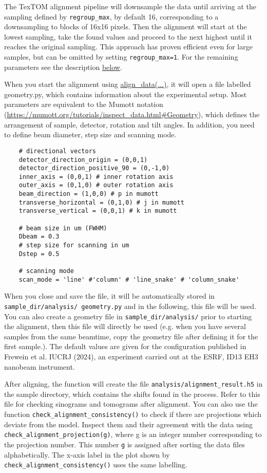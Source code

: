 The TexTOM alignment pipeline will downsample the data until arriving at the 
sampling defined by \texttt{regroup\_max}, by default 16, corresponding to a downsampling to blocks of 16x16 pixels.
Then the alignment will start at the lowest sampling, take the found values and proceed to the next highest until it reaches the
original sampling. This approach has proven efficient even for large samples, but can be omitted by setting \texttt{regroup\_max=1}.
For the remaining parameters see the description \hyperref[fun:aligndata]{below}.

When you start the alignment using \hyperref[fun:aligndata]{align\_data(...)}, it will open a file labelled geometry.py, which contains information about the
experimental setup. Most parameters are equivalent to the Mumott notation (\url{https://mumott.org/tutorials/inspect_data.html#Geometry}),
which defines the arrangement of sample, detector, rotation and tilt angles.
In addition, you need to define beam diameter, step size and scanning mode.

\begin{verbatim}
    # directional vectors
    detector_direction_origin = (0,0,1)
    detector_direction_positive_90 = (0,-1,0)
    inner_axis = (0,0,1) # inner rotation axis
    outer_axis = (0,1,0) # outer rotation axis
    beam_direction = (1,0,0) # p in mumott
    transverse_horizontal = (0,1,0) # j in mumott
    transverse_vertical = (0,0,1) # k in mumott
    
    # beam size in um (FWHM)
    Dbeam = 0.3 
    # step size for scanning in um
    Dstep = 0.5
    
    # scanning mode
    scan_mode = 'line' #'column' # 'line_snake' # 'column_snake'    
\end{verbatim}

When you close and save the file, it will be automatically stored in \texttt{sample\_dir/analysis/ geometry.py} and in the following,
this file will be used. You can also create a geometry file in \texttt{sample\_dir/analysis/} prior to starting the alignment,
then this file will directly be used (e.g. when you have several samples from the same beamtime, copy the geometry file after
defining it for the first sample.). The default values are given for the configuration published in Frewein et al. IUCRJ (2024), an experiment
carried out at the ESRF, ID13 EH3 nanobeam instrument.

After aligning, the function will create the file \texttt{analysis/alignment\_result.h5} in the sample directory, which contains the shifts found
in the process. Refer to this file for checking sinograms and tomograms after alignment.
You can also use the function \texttt{check\_alignment\_consistency()} to check if there are projections which deviate from the
model. Inspect them and their agreement with the data using \texttt{check\_alignment\_projection(g)}, where g is an integer number
corresponding to the projection number. This number \texttt{g} is assigned after sorting the data files alphabetically.
The x-axis label in the plot shown by \texttt{check\_alignment\_consistency()} uses the same labelling.

